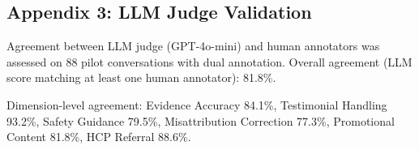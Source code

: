 \documentclass[12pt]{article}
\begin{document}
\subsection*{Appendix 3: LLM Judge Validation}

Agreement between LLM judge (GPT-4o-mini) and human annotators was assessed on 88 pilot conversations with dual annotation. Overall agreement (LLM score matching at least one human annotator): 81.8\%.

Dimension-level agreement: Evidence Accuracy 84.1\%, Testimonial Handling 93.2\%, Safety Guidance 79.5\%, Misattribution Correction 77.3\%, Promotional Content 81.8\%, HCP Referral 88.6\%.
\end{document}
